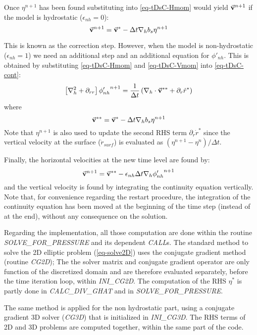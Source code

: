 Once ${\eta}^{n+1}$ has been found substituting into \ref{eq-tDsC-Hmom}
would yield $\vec{\bf v}^{n+1}$ if the model is hydrostatic
($\epsilon_{nh}=0$):
$$
\vec{\bf v}^{n+1} = \vec{\bf v}^{*}
- \Delta t {\bf \nabla}_h b_s {\eta}^{n+1}
$$

This is known as the correction step. However, when the model is
non-hydrostatic ($\epsilon_{nh}=1$) we need an additional step and an
additional equation for $\phi'_{nh}$. This is obtained by
substituting \ref{eq-tDsC-Hmom} and \ref{eq-tDsC-Vmom} into
\ref{eq-tDsC-cont}:
\begin{equation}
\left[ {\bf \nabla}_h^2 + \partial_{rr} \right] {\phi'_{nh}}^{n+1}
= \frac{1}{\Delta t} \left(
{\bf \nabla}_h \cdot \vec{\bf v}^{**} + \partial_r \dot{r}^* \right)
\end{equation}
where
\begin{displaymath}
\vec{\bf v}^{**} = \vec{\bf v}^* - \Delta t {\bf \nabla}_h b_s {\eta}^{n+1}
\end{displaymath}
Note that $\eta^{n+1}$ is also used to update the second RHS term
$\partial_r \dot{r}^* $ since
the vertical velocity at the surface ($\dot{r}_{surf}$) 
is evaluated as $(\eta^{n+1} - \eta^n) / \Delta t$.

Finally, the horizontal velocities at the new time level are found by:
\begin{equation}
\vec{\bf v}^{n+1} = \vec{\bf v}^{**}
- \epsilon_{nh} \Delta t {\bf \nabla}_h {\phi'_{nh}}^{n+1}
\end{equation}
and the vertical velocity is found by integrating the continuity
equation vertically.
Note that, for convenience regarding the restart procedure,
the integration of the continuity equation has been 
moved at the beginning of the time step (instead of at the end),
without any consequence on the solution.

Regarding the implementation, all those computation are done
within the routine {\it SOLVE\_FOR\_PRESSURE} and its dependent 
{\it CALL}s.
The standard method to solve the 2D elliptic problem (\ref{eq-solve2D})
uses the conjugate gradient method (routine {\it CG2D}); The 
the solver matrix and conjugate gradient operator are only function
of the discretized domain and are therefore evaluated separately,
before the time iteration loop, within {\it INI\_CG2D}. 
The computation of the RHS $\eta^*$ is partly 
done in {\it CALC\_DIV\_GHAT} and in {\it SOLVE\_FOR\_PRESSURE}.

The same method is applied for the non hydrostatic part, using
a conjugate gradient 3D solver ({\it CG3D}) that is initialized 
in {\it INI\_CG3D}. The RHS terms of 2D and 3D problems 
are computed together, within the same part of the code.


